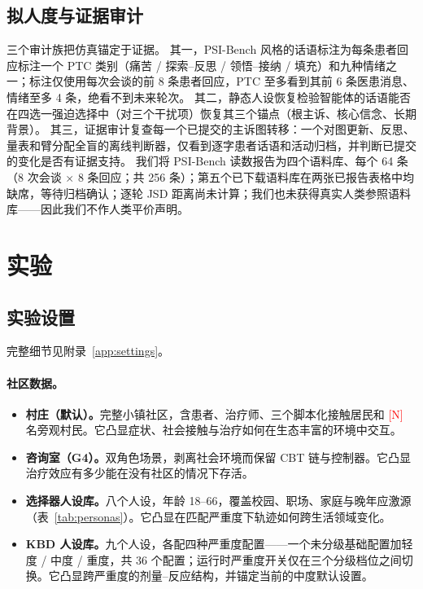 \documentclass[11pt,a4paper]{article}
\newcommand{\ph}[1]{\textcolor{red}{[#1]}}
\begin{document}
\subsection{拟人度与证据审计}\label{sec:humaneval}

三个审计族把仿真锚定于证据。
其一，PSI-Bench 风格的话语标注为每条患者回应标注一个 PTC 类别（痛苦 / 探索--反思 / 领悟--接纳 / 填充）和九种情绪之一；标注仅使用每次会谈的前 8 条患者回应，PTC 至多看到其前 6 条医患消息、情绪至多 4 条，绝看不到未来轮次。
其二，静态人设恢复检验智能体的话语能否在四选一强迫选择中（对三个干扰项）恢复其三个锚点（根主诉、核心信念、长期背景）。
其三，证据审计复查每一个已提交的主诉图转移：一个对图更新、反思、量表和臂分配全盲的离线判断器，仅看到逐字患者话语和活动归档，并判断已提交的变化是否有证据支持。
我们将 PSI-Bench 读数报告为四个语料库、每个 64 条（8 次会谈 $\times$ 8 条回应；共 256 条）；第五个已下载语料库在两张已报告表格中均缺席，等待归档确认；逐轮 JSD 距离尚未计算；我们也未获得真实人类参照语料库——因此我们不作人类平价声明。

\section{实验}\label{sec:exp}

\subsection{实验设置}\label{sec:setup}

完整细节见附录~\ref{app:settings}。

\paragraph{社区数据。}
\begin{itemize}
\item \textbf{村庄（默认）。}完整小镇社区，含患者、治疗师、三个脚本化接触居民和 \ph{N} 名旁观村民。它凸显症状、社会接触与治疗如何在生态丰富的环境中交互。
\item \textbf{咨询室（G4）。}双角色场景，剥离社会环境而保留 CBT 链与控制器。它凸显治疗效应有多少能在没有社区的情况下存活。
\item \textbf{选择器人设库。}八个人设，年龄 18--66，覆盖校园、职场、家庭与晚年应激源（表~\ref{tab:personas}）。它凸显在匹配严重度下轨迹如何跨生活领域变化。
\item \textbf{KBD 人设库。}九个人设，各配四种严重度配置——一个未分级基础配置加轻度 / 中度 / 重度，共 36 个配置；运行时严重度开关仅在三个分级档位之间切换。它凸显跨严重度的剂量--反应结构，并锚定当前的中度默认设置。
\end{itemize}
\end{document}
